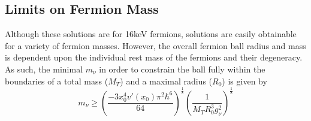 \subsection{Limits on Fermion Mass}
\label{sec_fermionlimits}
Although these solutions are for 16keV fermions, solutions are easily obtainable for a variety of fermion masses. However, the overall
fermion ball radius and mass is dependent upon the individual rest mass of the fermions and their degeneracy. As such, the minimal
$m_\nu$ in order to constrain the ball fully within the boundaries of a total mass ($M_T$) and a maximal radius ($R_0$) is given by
\begin{equation}
	m_\nu \ge \left( \frac{ - 3 x_0^4 v'(x_0) \pi^2 \hbar^6}{64} \right)^\frac{1}{8} \left(\frac{1}{M_T R_0^3 g_\nu^2}\right)^\frac{1}{8}
	\label{eqn_classicalfermionmass}
\end{equation}

